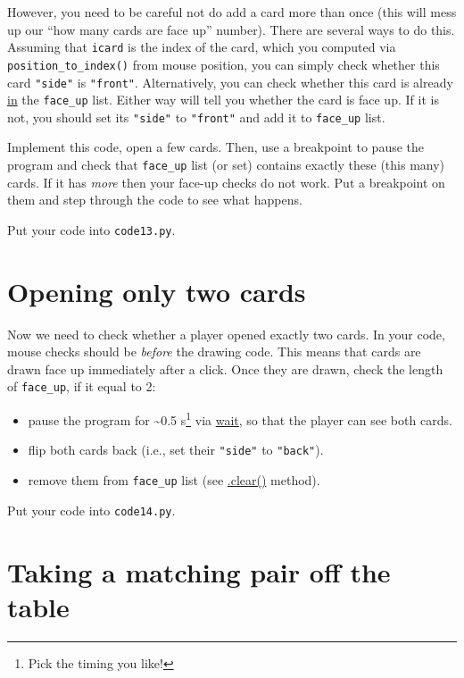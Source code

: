\documentclass[
]{book}
\providecommand{\tightlist}{%
  \setlength{\itemsep}{0pt}\setlength{\parskip}{0pt}}
\begin{document}
However, you need to be careful not do add a card more than once (this will mess up our ``how many cards are face up'' number). There are several ways to do this. Assuming that \texttt{icard} is the index of the card, which you computed via \texttt{position\_to\_index()} from mouse position, you can simply check whether this card \texttt{"side"} is \texttt{"front"}. Alternatively, you can check whether this card is already \href{https://docs.python.org/3/reference/expressions.html?highlight=list\%20dictionary\#in}{in} the \texttt{face\_up} list. Either way will tell you whether the card is face up. If it is not, you should set its \texttt{"side"} to \texttt{"front"} and add it to \texttt{face\_up} list.

Implement this code, open a few cards. Then, use a breakpoint to pause the program and check that \texttt{face\_up} list (or set) contains exactly these (this many) cards. If it has \emph{more} then your face-up checks do not work. Put a breakpoint on them and step through the code to see what happens.

Put your code into \texttt{code13.py}.

\hypertarget{opening-only-two-cards}{%
\section{Opening only two cards}\label{opening-only-two-cards}}

Now we need to check whether a player opened exactly two cards. In your code, mouse checks should be \emph{before} the drawing code. This means that cards are drawn face up immediately after a click. Once they are drawn, check the length of \texttt{face\_up}, if it equal to 2:

\begin{itemize}
\tightlist
\item
  pause the program for \textasciitilde0.5 s\footnote{Pick the timing you like!} via \href{https://psychopy.org/api/clock.html\#psychopy.clock.wait}{wait}, so that the player can see both cards.
\item
  flip both cards back (i.e., set their \texttt{"side"} to \texttt{"back"}).
\item
  remove them from \texttt{face\_up} list (see \href{https://docs.python.org/3/tutorial/datastructures.html\#more-on-lists}{.clear()} method).
\end{itemize}

Put your code into \texttt{code14.py}.

\hypertarget{taking-a-matching-pair-off-the-table}{%
\section{Taking a matching pair off the table}\label{taking-a-matching-pair-off-the-table}}
\end{document}
